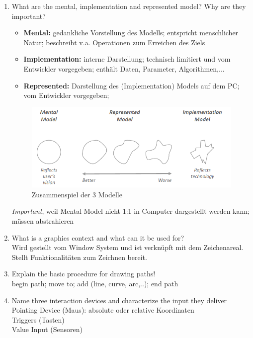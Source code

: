 \begin{enumerate}
	\item What are the mental, implementation and represented model? Why are they important?
	\begin{itemize}
		\item \textbf{Mental:} gedankliche Vorstellung des Modells; entspricht menschlicher Natur; beschreibt v.a. Operationen zum Erreichen des Ziels
		\item \textbf{Implementation:} interne Darstellung; technisch limitiert und vom Entwickler vorgegeben; enthält Daten, Parameter, Algorithmen,...
		\item \textbf{Represented:} Darstellung des (Implementation) Models auf dem PC; vom Entwickler vorgegeben;
	\end{itemize}
	
	\begin{figure}[!h]
		\centering
		\includegraphics[scale=0.5]{img/models.png}
		\caption{Zusammenspiel der 3 Modelle}
	\end{figure}
	\textit{Important}, weil Mental Model nicht 1:1 in Computer dargestellt werden kann; müssen abstrahieren
	
	\item What is a graphics context and what can it be used for?\\
	Wird gestellt vom Window System und ist verknüpft mit dem Zeichenareal.\\
	Stellt Funktionalitäten zum Zeichnen bereit.
	
	\item Explain the basic procedure for drawing paths!\\
	begin path; move to; add (line, curve, arc,..); end path
	
	\item Name three interaction devices and characterize the input they deliver\\
	Pointing Device (Maus): absolute oder relative Koordinaten\\
	Triggers (Tasten)\\
	Value Input (Sensoren)


\end{enumerate}
